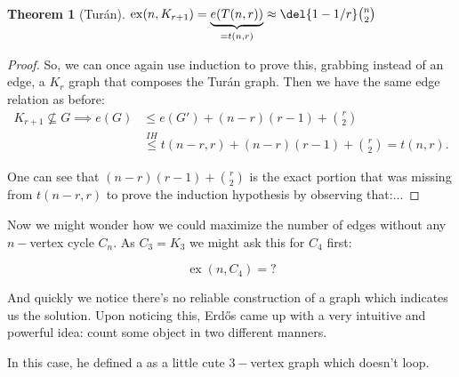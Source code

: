 \documentclass[english, dark, index]{Iart}
\newtheorem{theorem}{Theorem}[part]
\DeclareMathOperator{\ex}{ex}
\begin{document}
	\begin{theorem}[Turán]
		$ \ex(n,K_{r+1})=\underbrace{e(T(n,r))}_{=t(n,r)}\approx \del{1-1/r}\binom{n}{2} $
	\end{theorem}
	
	\begin{proof}
		So, we can once again use induction to prove this, grabbing instead of an edge, a $ K_{r} $ graph that composes the Turán graph. Then we have the same edge relation as before:
		\begin{align*}
			K_{r+1}\nsubseteq G\implies e(G)&\leqslant e(G')+(n-r)(r-1)+\binom{r}{2}\\
			&\overset{IH}{\leqslant}t(n-r,r)+(n-r)(r-1)+\binom{r}{2}=t(n,r).
		\end{align*}
		
		One can see that $ (n-r)(r-1)+\binom{r}{2} $ is the exact portion that was missing from $ t(n-r,r) $ to prove the induction hypothesis by observing that:...
	
	\end{proof}

	Now we might wonder how we could maximize the number of edges without any $ n- $vertex cycle $ C_n $. As $ C_3=K_3 $ we might ask this for $ C_4 $ first:
	
	\[ \ex(n,C_4)=? \]
	
	And quickly we notice there's no reliable construction of a graph which indicates us the solution. Upon noticing this, Erdős came up with a very intuitive and powerful idea: count some object in two different manners.
	
	In this case, he defined a  as a little cute $ 3- $vertex graph which doesn't loop.
\end{document}
